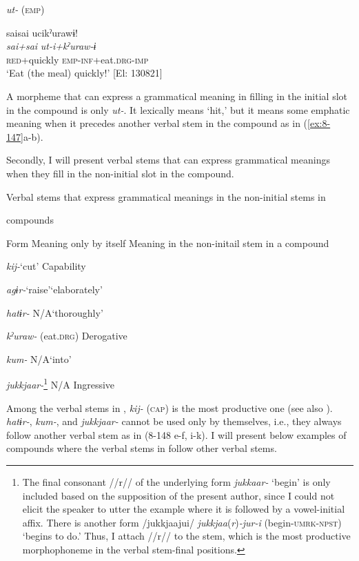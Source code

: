 \ex \textit{ut-} (\textsc{emp})

{\TM}
\glll  saisai  ucikˀurawɨ!\\
\textit{sai+sai}  \textit{ut-i+kˀuraw-ɨ}\\
\textsc{red}+quickly  \textsc{emp}-\textsc{inf}+eat.\textsc{drg}-\textsc{imp}\\
\glt ‘Eat (the meal) quickly!’ [El: 130821]
\z
\z

A morpheme that can express a grammatical meaning in filling in the initial slot in the compound is only \textit{ut-}. It lexically means ‘hit,’ but it means some emphatic meaning when it precedes another verbal stem in the compound as in (\ref{ex:8-147}a-b).

  Secondly, I will present verbal stems that can express grammatical meanings when they fill in the non-initial slot in the compound.

\begin{table}
\caption{\label{tab:key:87}Verbal stems that express grammatical meanings in the non-initial stems in} \textmd{compounds}

Form    Meaning only by itself    Meaning in the non-initail stem in a compound

\textit{kij-}\glt ‘cut’    Capability

\textit{agɨr-}\glt ‘raise’\glt ‘elaborately’

\textit{hatɨr-}    N/A\glt ‘thoroughly’

\textit{kˀuraw-}    (eat.\textsc{drg})    Derogative

\textit{kum-}    N/A\glt ‘into’

\textit{jukkjaar-}\footnote{The final consonant //r// of the underlying form \textit{jukkaar-} ‘begin’ is only included based on the supposition of the present author, since I could not elicit the speaker to utter the example where it is followed by a vowel-initial affix. There is another form /jukkjaajui/ \textit{jukkjaa}(\textit{r})\textit{-jur-i} (begin-\textsc{umrk}-\textsc{npst}) ‘begins to do.’ Thus, I attach //r// to the stem, which is the most productive morphophoneme in the verbal stem-final positions.}    N/A    Ingressive
\end{table}

Among the verbal stems in , \textit{kij-} (\textsc{cap}) is the most productive one (see also ). \textit{hatɨr-}, \textit{kum-}, and \textit{jukkjaar-} cannot be used only by themselves, i.e., they always follow another verbal stem as in (8-148 e-f, i-k). I will present below examples of compounds where the verbal stems in  follow other verbal stems.

